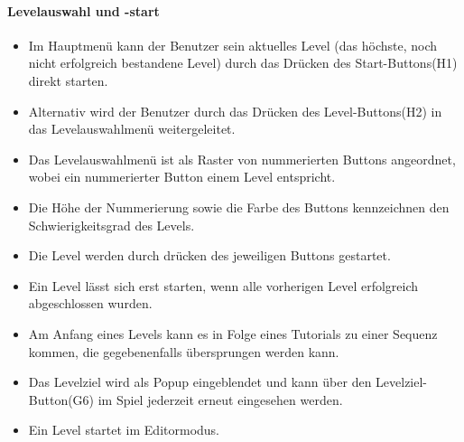 \paragraph{Levelauswahl und -start}
\begin{itemize}
	\item Im Hauptmenü kann der Benutzer sein aktuelles Level (das höchste, noch nicht erfolgreich bestandene Level) durch das Drücken des Start-Buttons(H1) direkt starten.
	\item Alternativ wird der Benutzer durch das Drücken des Level-Buttons(H2) in das Levelauswahlmenü weitergeleitet.
	\item Das Levelauswahlmenü ist als Raster von nummerierten Buttons angeordnet, wobei ein nummerierter Button einem Level entspricht.
	\item Die Höhe der Nummerierung sowie die Farbe des Buttons kennzeichnen den Schwierigkeitsgrad des Levels.
	\item Die Level werden durch drücken des jeweiligen Buttons gestartet.
	\item Ein Level lässt sich erst starten, wenn alle vorherigen Level erfolgreich abgeschlossen wurden.
	\item Am Anfang eines Levels kann es in Folge eines Tutorials zu einer Sequenz kommen, die gegebenenfalls übersprungen werden kann.
	\item Das Levelziel wird als Popup eingeblendet und kann über den Levelziel-Button(G6) im Spiel jederzeit erneut eingesehen werden.
	\item Ein Level startet im Editormodus.
\end{itemize}
